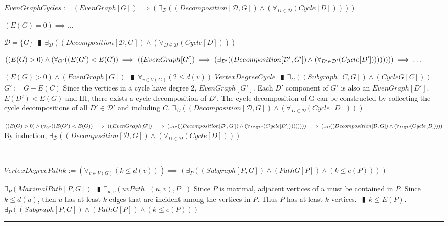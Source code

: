 \documentclass{book}
\newcommand{\abr}{:=}
\newcommand{\pipe}{$\phantom{(}\vrectangleblack\phantom{)}$}
\begin{document}
$EvenGraphCycles \abr (EvenGraph[G]) \implies (\exists_{\mathcal{D}}((Decomposition[\mathcal{D}, G]) \land (\forall_{D \in \mathcal{D}}(Cycle[D]))))$
\begin{enumerate}
  \lit $(E(G) = 0) \implies \ldots$
  \begin{enumerate}
    \lit $\mathcal{D} = \{G\}$ \pipe $\exists_{\mathcal{D}}((Decomposition[\mathcal{D}, G]) \land (\forall_{D \in \mathcal{D}}(Cycle[D])))$
  \end{enumerate}
  \lit $((E(G) > 0) \land (\forall_{G'}((E(G') < E(G)) \implies ((EvenGraph[G']) \implies (\exists_{\mathcal{D}'}((Decomposition[\mathcal{D}', G']) \land (\forall_{D' \in \mathcal{D}'}(Cycle[D'])))))))) \\
       \implies \ldots$
  \begin{enumerate}
    \lit $(E(G) > 0) \land (EvenGraph[G])$ \pipe $\forall_{v \in V(G)}(2 \leq d(v))$
    \lit $VertexDegreeCycle$ \pipe $\exists_{C}((Subgraph[C, G]) \land (CycleG[C]))$
    \lit $G' \abr G - E(C)$
    \lit Since the vertices in a cycle have degree 2, $EvenGraph[G']$. Each $D'$ component of $G'$ is also an $EvenGraph[D']$.
    \lit $E(D') < E(G)$ and IH, there exists a cycle decomposition of $D'$.
    \lit The cycle decomposition of G can be constructed by collecting the cycle decompositions of all $D' \in \mathcal{D}'$ and including $C$.
    \lit $\exists_{\mathcal{D}}((Decomposition[\mathcal{D}, G]) \land (\forall_{D \in \mathcal{D}}(Cycle[D])))$
  \end{enumerate}
  \lit $((E(G) > 0) \land (\forall_{G'}((E(G') < E(G)) \implies ((EvenGraph[G']) \implies (\exists_{\mathcal{D}'}((Decomposition[\mathcal{D}', G']) \land (\forall_{D' \in \mathcal{D}'}(Cycle[D'])))))))) \\
       \implies (\exists_{\mathcal{D}}((Decomposition[\mathcal{D}, G]) \land (\forall_{D \in \mathcal{D}}(Cycle[D]))))$
  \lit By induction, $\exists_{\mathcal{D}}((Decomposition[\mathcal{D}, G]) \land (\forall_{D \in \mathcal{D}}(Cycle[D])))$
\end{enumerate} \vspace{.75mm} \hrule \vspace{.75mm} \ \\ 


$VertexDegreePathk \abr (\forall_{v \in V(G)}(k \leq d(v))) \implies (\exists_{P}((Subgraph[P, G]) \land (PathG[P]) \land (k \leq e(P))))$
\begin{enumerate}
  \lit $\exists_{P}(MaximalPath[P, G])$ \pipe $\exists_{u, v}(uvPath[(u, v), P])$
  \lit Since $P$ is maximal, adjacent vertices of $u$ must be contained in $P$.
  \lit Since $k \leq d(u)$, then $u$ has at least $k$ edges that are incident among the vertices in $P$.
  \lit Thus $P$ has at least $k$ vertices. \pipe $k \leq E(P)$.
  \lit $\exists_{P}((Subgraph[P, G]) \land (PathG[P]) \land (k \leq e(P)))$
\end{enumerate} \vspace{.75mm} \hrule \vspace{.75mm} \ \\ 
\end{document}
